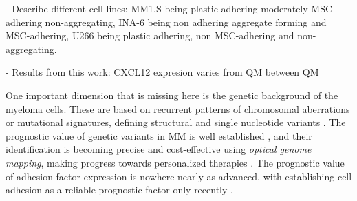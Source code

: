 



% 

\unnsubsection{\cadddiversitytitle}%
\label{sec:discussion_cadddiversity}%

- Describe different cell lines: MM1.S being plastic adhering moderately
MSC-adhering non-aggregating, INA-6 being non adhering aggregate forming and
MSC-adhering, U266 being plastic adhering, non MSC-adhering and
non-aggregating.

- Results from this work: CXCL12 expresion varies from QM between QM

One important dimension that is missing here is the genetic background of the
myeloma cells. These are based on recurrent patterns of chromosomal aberrations
or mutational signatures, defining structural and single nucleotide variants
\cite{kumarMultipleMyelomasCurrent2018a,
    hoangMutationalProcessesContributing2019}. The prognostic value of genetic
variants in MM is well established \cite{sharmaPrognosticRoleMYC2021}, and their
identification is becoming precise and cost-effective using \emph{optical
    genome mapping}, making progress towards personalized therapies
\cite{zouComprehensiveApproachEvaluate2024,
    budurleanIntegratingOpticalGenome2024}. The prognostic value of adhesion factor
expression is nowhere nearly as advanced, with establishing cell adhesion as a
reliable prognostic factor only recently
\cite{huDevelopmentCellAdhesionbased2024}.

